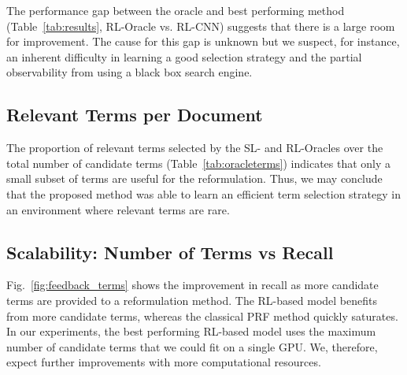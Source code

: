 \documentclass[11pt,letterpaper]{article}
\begin{document}
The performance gap between the oracle and best performing method (Table~\ref{tab:results}, RL-Oracle vs. RL-CNN) suggests that there is a large room for improvement. The cause for this gap is unknown but we suspect, for instance, an inherent difficulty in learning a good selection strategy and the partial observability from using a black box search engine.

\subsection {Relevant Terms per Document}

The proportion of relevant terms selected by the SL- and RL-Oracles over the total number of candidate terms (Table~\ref{tab:oracleterms}) indicates that only a small subset of terms are useful for the reformulation. Thus, we may conclude that the proposed method was able to learn an efficient term selection strategy in an environment where relevant terms are rare.


\subsection{Scalability: Number of Terms vs Recall}

Fig.~\ref{fig:feedback_terms} shows the improvement in recall as more candidate terms are provided to a reformulation method. The RL-based model benefits from more candidate terms, whereas the classical PRF method quickly saturates. In our experiments, the best performing RL-based model uses the maximum number of candidate terms that we could fit on a single GPU. We, therefore, expect further improvements with more computational resources.
\end{document}
